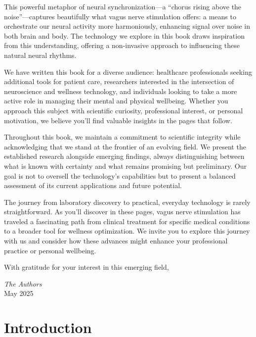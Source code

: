 \documentclass[
  Letterpaper,
]{scrbook}
\begin{document}
This powerful metaphor of neural synchronization---a ``chorus rising
above the noise''---captures beautifully what vagus nerve stimulation
offers: a means to orchestrate our neural activity more harmoniously,
enhancing signal over noise in both brain and body. The technology we
explore in this book draws inspiration from this understanding, offering
a non-invasive approach to influencing these natural neural rhythms.

We have written this book for a diverse audience: healthcare
professionals seeking additional tools for patient care, researchers
interested in the intersection of neuroscience and wellness technology,
and individuals looking to take a more active role in managing their
mental and physical wellbeing. Whether you approach this subject with
scientific curiosity, professional interest, or personal motivation, we
believe you'll find valuable insights in the pages that follow.

Throughout this book, we maintain a commitment to scientific integrity
while acknowledging that we stand at the frontier of an evolving field.
We present the established research alongside emerging findings, always
distinguishing between what is known with certainty and what remains
promising but preliminary. Our goal is not to oversell the technology's
capabilities but to present a balanced assessment of its current
applications and future potential.

The journey from laboratory discovery to practical, everyday technology
is rarely straightforward. As you'll discover in these pages, vagus
nerve stimulation has traveled a fascinating path from clinical
treatment for specific medical conditions to a broader tool for wellness
optimization. We invite you to explore this journey with us and consider
how these advances might enhance your professional practice or personal
wellbeing.

With gratitude for your interest in this emerging field,

\emph{The Authors}\\
May 2025


\chapter*{Introduction}\label{introduction}


\end{document}
